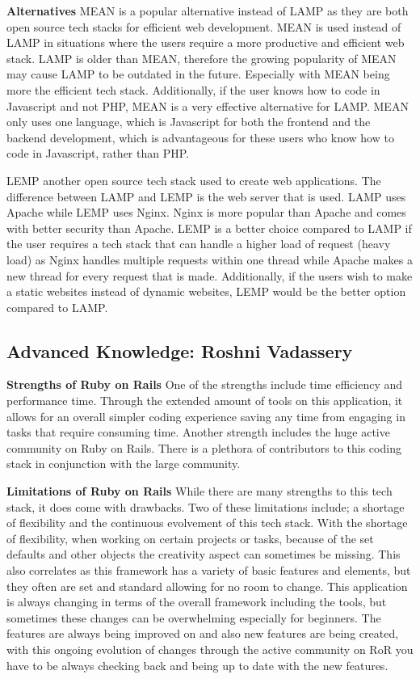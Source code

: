 \documentclass[a4paper, 11pt]{report}
\begin{document}
\textbf{Alternatives}
MEAN is a popular alternative instead of LAMP as they are both open source tech stacks for efficient web development. MEAN is used instead of LAMP in situations where the users require a more productive and efficient web stack. LAMP is older than MEAN, therefore the growing popularity of MEAN may cause LAMP to be outdated in the future. Especially with MEAN being more the efficient tech stack. Additionally, if the user knows how to code in Javascript and not PHP, MEAN is a very effective alternative for LAMP. MEAN only uses one language, which is Javascript for both the frontend and the backend development, which is advantageous for these users who know how to code in Javascript, rather than PHP.

LEMP another open source tech stack used to create web applications. The difference between LAMP and LEMP is the web server that is used. LAMP uses Apache while LEMP uses Nginx. Nginx is more popular than Apache and comes with better security than Apache. LEMP is a better choice compared to LAMP if the user requires a tech stack that can handle a higher load of request (heavy load) as Nginx handles multiple requests within one thread while Apache makes a new thread for every request that is made. Additionally, if the users wish to make a static websites instead of dynamic websites, LEMP would be the better option compared to LAMP.


\subsection{Advanced Knowledge: Roshni Vadassery}

\textbf{Strengths of Ruby on Rails}
One of the strengths include time efficiency and performance time. Through the extended amount of tools on this application, it allows for an overall simpler coding experience saving any time from engaging in tasks that require consuming time.  Another strength includes the huge active community on Ruby on Rails. There is a plethora of contributors to this coding stack in conjunction with the large community.

\textbf{Limitations of Ruby on Rails}
While there are many strengths to this tech stack, it does come with drawbacks. Two of these limitations include; a shortage of flexibility and the continuous evolvement of this tech stack. With the shortage of flexibility, when working on certain projects or tasks, because of the set defaults and other objects the creativity aspect can sometimes be missing. This also correlates as this framework has a variety of basic features and elements, but they often are set and standard allowing for no room to change. This application is always changing in terms of the overall framework including the tools, but sometimes these changes can be overwhelming especially for beginners. The features are always being improved on and also new features are being created, with this ongoing evolution of changes through the active community on RoR you have to be always checking back and being up to date with the new features.
\end{document}
